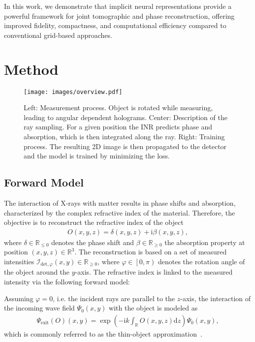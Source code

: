 \documentclass{article}
\begin{document}
In this work, we demonstrate that implicit neural representations provide a powerful framework for joint tomographic and phase reconstruction, offering improved fidelity, compactness, and computational efficiency compared to conventional grid-based approaches.
\section{Method}
\begin{figure*}
	\centering
	\texttt{[image: images/overview.pdf]}
	\caption{Left: Measurement process.
		Object is rotated while measuring, leading to angular dependent holograms.
		Center: Description of the ray sampling.
		For a given position the INR predicts phase and absorption, which is then integrated along the ray.
		Right: Training process.
		The resulting 2D image is then propagated to the detector and the model is trained by minimizing the loss.
	}
	\label{fig:overiew}
\end{figure*}

\subsection{Forward Model}
The interaction of X-rays with matter results in phase shifts and absorption, characterized by the complex refractive index of the material.
Therefore, the objective is to reconstruct the refractive index of the object  
\begin{align}
	O \left( x,y,z \right) = \delta \left( x,y,z \right) + \mathrm{i} \beta \left( x,y,z \right),
	\label{eq:refractive-index}
\end{align}
where $\delta \in \mathbb{R}_{\leq 0}$ denotes the phase shift and $\beta \in \mathbb{R}_{\geq 0}$ the absorption property at position $\left( x,y,z \right) \in \mathbb{R}^{3}$.  
The reconstruction is based on a set of measured intensities $\mathcal{I}_{\text{det}, \varphi} \left( x,y \right) \in \mathbb{R}_{\geq 0}$, where $\varphi \in \left[ 0, \pi \right)$ denotes the rotation angle of the object around the $y$-axis.  
The refractive index is linked to the measured intensity via the following forward model:

Assuming $\varphi = 0$, i.e. the incident rays are parallel to the $z$-axis, the interaction of the incoming wave field $\Psi_{0} \left( x,y \right)$ with the object is modeled as  
\begin{align}
	\Psi_{\text{exit}} \left( O \right) \left( x,y \right) = 
	\exp \left( - \mathrm{i}k  \int_{\mathbb{R}} O \left( x,y,z \right) \mathrm{d}z \right) 
	\Psi_{0}\left( x,y \right),
	\label{eq:thin-object}
\end{align}
which is commonly referred to as the thin-object approximation~\cite{paganinCoherentXrayOptics2006a}.  
\end{document}
